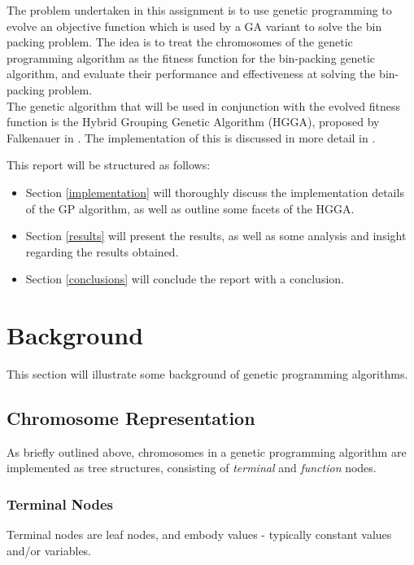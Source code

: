 \documentclass[conference]{IEEEtran}
\begin{document}
The problem undertaken in this assignment is to use genetic programming to evolve an objective function which is used by a GA variant to solve the bin packing problem. The idea is to treat the chromosomes of the genetic programming algorithm as the fitness function for the bin-packing genetic algorithm, and evaluate their performance and effectiveness at solving the bin-packing problem.\\

The genetic algorithm that will be used in conjunction with the evolved fitness function is the Hybrid Grouping Genetic Algorithm (HGGA), proposed by Falkenauer in \cite{Falkenauer1996}. The implementation of this is discussed in more detail in \cite{jason2018}.

This report will be structured as follows:
\begin{itemize}
  \item Section \ref{implementation} will thoroughly discuss the implementation details of the GP algorithm, as well as outline some facets of the HGGA.
  \item Section \ref{results} will present the results, as well as some analysis and insight regarding the results obtained.
  \item Section \ref{conclusions} will conclude the report with a conclusion.
\end{itemize}

\section{Background}
This section will illustrate some background of genetic programming algorithms.

\subsection{Chromosome Representation}
As briefly outlined above, chromosomes in a genetic programming algorithm are implemented as tree structures, consisting of \textit{terminal} and \textit{function} nodes.\\

\subsubsection{Terminal Nodes}
Terminal nodes are leaf nodes, and embody values - typically constant values and/or variables.\\
\end{document}
